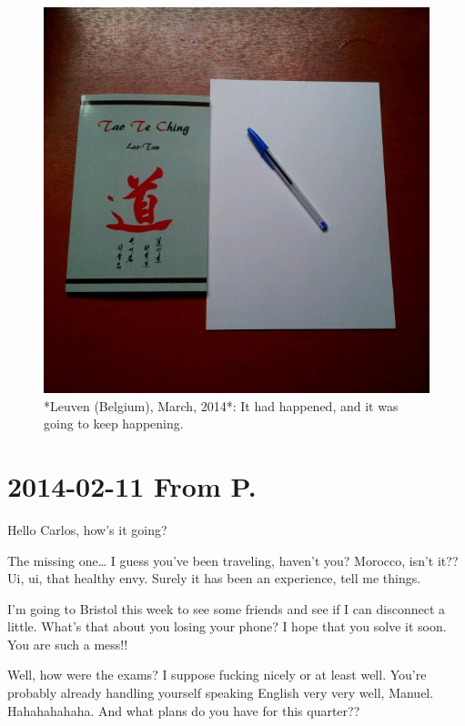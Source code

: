 \documentclass[]{book}
\begin{document}
\begin{figure}

{\centering \includegraphics[width=0.75\linewidth]{images/2014/tao} 

}

\caption{*Leuven (Belgium), March, 2014*: It had happened, and it was going to keep happening.}\label{fig:tao}
\end{figure}

\hypertarget{frompaloma20140211}{%
\section*{2014-02-11 From P.}\label{frompaloma20140211}}

Hello Carlos, how's it going?

The missing one\ldots{} I guess you've been traveling, haven't you? Morocco, isn't it?? Ui, ui, that healthy envy. Surely it has been an experience, tell me things.

I'm going to Bristol this week to see some friends and see if I can disconnect a little. What's that about you losing your phone? I hope that you solve it soon. You are such a mess!!

Well, how were the exams? I suppose fucking nicely or at least well. You're probably already handling yourself speaking English very very well, Manuel. Hahahahahaha. And what plans do you have for this quarter??
\end{document}
